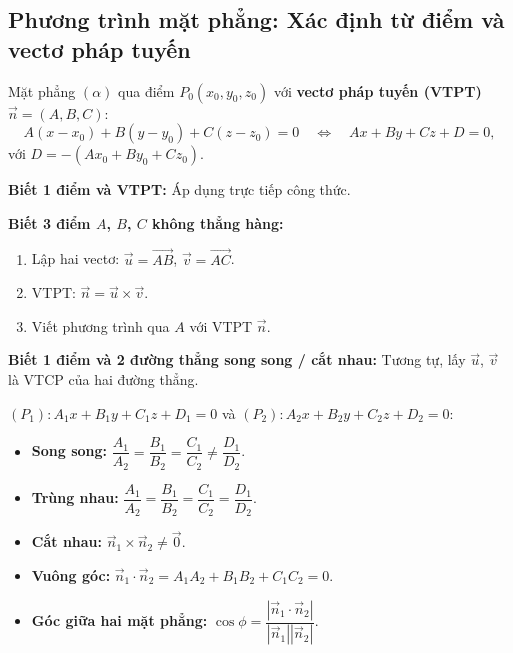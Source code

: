 \documentclass[12pt,a4paper]{article}
\begin{document}
\subsection{Phương trình mặt phẳng: Xác định từ điểm và vectơ pháp tuyến}

\begin{dinhnghia}[title={Phương trình mặt phẳng}]
  Mặt phẳng $(\alpha)$ qua điểm $P_0(x_0, y_0, z_0)$ với \textbf{vectơ pháp tuyến (VTPT)} $\vec{n} = (A, B, C)$:
  \[
    A(x - x_0) + B(y - y_0) + C(z - z_0) = 0 \quad \Leftrightarrow \quad Ax + By + Cz + D = 0,
  \]
  với $D = -(Ax_0 + By_0 + Cz_0)$.
\end{dinhnghia}

\begin{phuongphap}[title={Viết phương trình mặt phẳng}]
  \textbf{Biết 1 điểm và VTPT:} Áp dụng trực tiếp công thức.

  \textbf{Biết 3 điểm $A$, $B$, $C$ không thẳng hàng:}
  \begin{enumerate}
    \item Lập hai vectơ: $\vec{u} = \overrightarrow{AB}$, $\vec{v} = \overrightarrow{AC}$.
    \item VTPT: $\vec{n} = \vec{u} \times \vec{v}$.
    \item Viết phương trình qua $A$ với VTPT $\vec{n}$.
  \end{enumerate}

  \textbf{Biết 1 điểm và 2 đường thẳng song song / cắt nhau:} Tương tự, lấy $\vec{u}$, $\vec{v}$ là VTCP của hai đường thẳng.
\end{phuongphap}

\begin{congthuc}[title={Vị trí tương đối hai mặt phẳng}]
  $(P_1): A_1x+B_1y+C_1z+D_1=0$ và $(P_2): A_2x+B_2y+C_2z+D_2=0$:
  \begin{itemize}
    \item \textbf{Song song:} $\dfrac{A_1}{A_2}=\dfrac{B_1}{B_2}=\dfrac{C_1}{C_2} \ne \dfrac{D_1}{D_2}$.
    \item \textbf{Trùng nhau:} $\dfrac{A_1}{A_2}=\dfrac{B_1}{B_2}=\dfrac{C_1}{C_2}=\dfrac{D_1}{D_2}$.
    \item \textbf{Cắt nhau:} $\vec{n}_1 \times \vec{n}_2 \ne \vec{0}$.
    \item \textbf{Vuông góc:} $\vec{n}_1 \cdot \vec{n}_2 = A_1A_2+B_1B_2+C_1C_2 = 0$.
    \item \textbf{Góc giữa hai mặt phẳng:} $\cos\phi = \dfrac{|\vec{n}_1\cdot\vec{n}_2|}{|\vec{n}_1||\vec{n}_2|}$.
  \end{itemize}
\end{congthuc}
\end{document}
